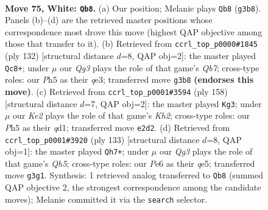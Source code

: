 \documentclass[11pt]{article}
\begin{document}
\clearpage

\begin{figure}[p]\centering
\begin{subfigure}{0.46\textwidth}\centering
\resizebox{\linewidth}{!}{%
\newchessgame
\chessboard[
  setfen={8/6P1/4P3/7P/k7/6Q1/4K3/8 w - - 7 75},
  showmover=false,
  pgfstyle=straightmove, color=movearrow, markmove={g3-b8}
]}
\caption{}
\end{subfigure}\hfill
\begin{subfigure}{0.46\textwidth}\centering
\resizebox{\linewidth}{!}{%
\newchessgame
\chessboard[
  setfen={7k/1Q6/8/7p/1P6/4q3/7K/8 w - - 2 67},
  showmover=false,
  pgfstyle=straightmove, color=movearrow, markmove={b7-c8}
]}
\caption{}
\end{subfigure}
\\[4pt]
\begin{subfigure}{0.46\textwidth}\centering
\resizebox{\linewidth}{!}{%
\newchessgame
\chessboard[
  setfen={5Q2/1k6/8/8/5P2/8/7K/3q4 w - - 0 80},
  showmover=false,
  pgfstyle=straightmove, color=movearrow, markmove={h2-g3}
]}
\caption{}
\end{subfigure}\hfill
\begin{subfigure}{0.46\textwidth}\centering
\resizebox{\linewidth}{!}{%
\newchessgame
\chessboard[
  setfen={8/1k1P1K2/8/4Q3/p6q/8/8/8 b - - 4 67},
  showmover=false,
  pgfstyle=straightmove, color=movearrow, markmove={h4-h7}
]}
\caption{}
\end{subfigure}
\caption{\textbf{Move 75, White: \texttt{Qb8}.} (a) Our position; Melanie plays \texttt{Qb8} (\texttt{g3b8}). Panels (b)--(d) are the retrieved master positions whose correspondence most drove this move (highest QAP objective among those that transfer to it). (b) Retrieved from \texttt{ccrl\_top\_p0000\#1845} (ply 132) [structural distance $d$=8, QAP obj=2]: the master played \texttt{Qc8+}; under $\mu$ our \emph{Qg3} plays the role of that game's \emph{Qb7}; cross-type roles: our \emph{P}h5 as their \emph{q}e3; transferred move \texttt{g3b8} \textbf{(endorses this move)}. (c) Retrieved from \texttt{ccrl\_top\_p0001\#3594} (ply 158) [structural distance $d$=7, QAP obj=2]: the master played \texttt{Kg3}; under $\mu$ our \emph{Ke2} plays the role of that game's \emph{Kh2}; cross-type roles: our \emph{P}h5 as their \emph{q}d1; transferred move \texttt{e2d2}. (d) Retrieved from \texttt{ccrl\_top\_p0001\#3920} (ply 133) [structural distance $d$=8, QAP obj=1]: the master played \texttt{Qh7+}; under $\mu$ our \emph{Qg3} plays the role of that game's \emph{Qh5}; cross-type roles: our \emph{P}e6 as their \emph{q}e5; transferred move \texttt{g3g1}. Synthesis: 1 retrieved analog transferred to \texttt{Qb8} (summed QAP objective 2, the strongest correspondence among the candidate moves); Melanie committed it via the \texttt{search} selector.}
\label{fig:thought-m148}
\end{figure}
\end{document}

